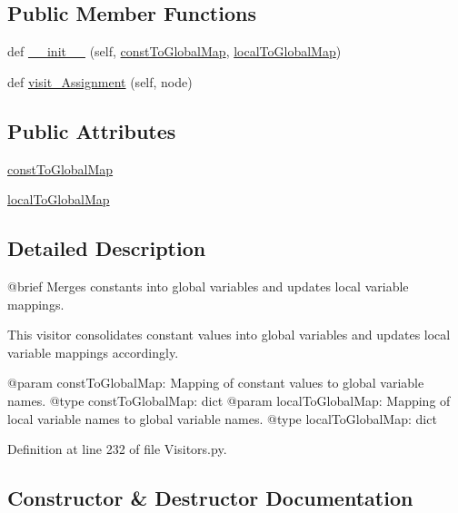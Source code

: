 \subsection*{Public Member Functions}
\begin{DoxyCompactItemize}
\item 
def \hyperlink{classVisitors_1_1ConstantMerger_af7415dba49be733196acc4fe0274fb1f}{\+\_\+\+\_\+init\+\_\+\+\_\+} (self, \hyperlink{classVisitors_1_1ConstantMerger_a09a8838a26160063ff7f70a6d8ca53f8}{const\+To\+Global\+Map}, \hyperlink{classVisitors_1_1ConstantMerger_a6aa7ad73b0ac6388e786fd93172a1421}{local\+To\+Global\+Map})
\item 
def \hyperlink{classVisitors_1_1ConstantMerger_adae6ad6f5b94c4acd95924bb3df9ebc8}{visit\+\_\+\+Assignment} (self, node)
\end{DoxyCompactItemize}
\subsection*{Public Attributes}
\begin{DoxyCompactItemize}
\item 
\hyperlink{classVisitors_1_1ConstantMerger_a09a8838a26160063ff7f70a6d8ca53f8}{const\+To\+Global\+Map}
\item 
\hyperlink{classVisitors_1_1ConstantMerger_a6aa7ad73b0ac6388e786fd93172a1421}{local\+To\+Global\+Map}
\end{DoxyCompactItemize}


\subsection{Detailed Description}
\begin{DoxyVerb}@brief Merges constants into global variables and updates local variable mappings.

This visitor consolidates constant values into global variables and updates local variable mappings accordingly.

@param constToGlobalMap: Mapping of constant values to global variable names.
@type constToGlobalMap: dict
@param localToGlobalMap: Mapping of local variable names to global variable names.
@type localToGlobalMap: dict
\end{DoxyVerb}
 

Definition at line 232 of file Visitors.\+py.



\subsection{Constructor \& Destructor Documentation}
\mbox{\label{classVisitors_1_1ConstantMerger_af7415dba49be733196acc4fe0274fb1f}} 

